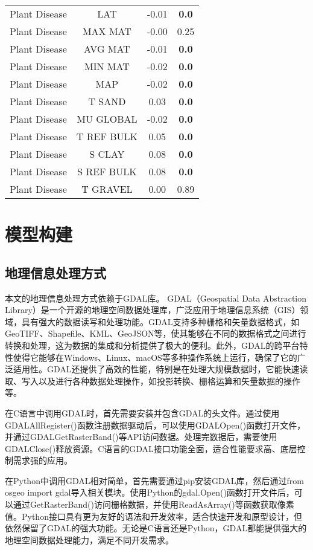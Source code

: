 \documentclass[AutoFakeBold]{LZUThesis-PgD&PhD}
\begin{document}
\begin{table}[H]
\begin{tabular}{cccc}
			Plant Disease & LAT & -0.01 & \textbf{0.0} \\
			Plant Disease & MAX MAT & -0.00 & 0.25 \\
			Plant Disease & AVG MAT & -0.01 & \textbf{0.0} \\
			Plant Disease & MIN MAT & -0.02 & \textbf{0.0} \\
			Plant Disease & MAP & -0.02 & \textbf{0.0} \\
			Plant Disease & T SAND & 0.03 & \textbf{0.0} \\
			Plant Disease & MU GLOBAL & -0.02 & \textbf{0.0} \\
			Plant Disease & T REF BULK & 0.05 & \textbf{0.0} \\
			Plant Disease & S CLAY & 0.08 & \textbf{0.0} \\
			Plant Disease & S REF BULK & 0.08 & \textbf{0.0} \\
			Plant Disease & T GRAVEL & 0.00 & 0.89 \\
			\bottomrule
		\end{tabular}
	\end{table}
	
	\chapter{模型构建}
	
	\section{地理信息处理方式}
	
	本文的地理信息处理方式依赖于GDAL库。
	GDAL（Geospatial Data Abstraction Library）是一个开源的地理空间数据处理库，广泛应用于地理信息系统（GIS）领域，具有强大的数据读写和处理功能。GDAL支持多种栅格和矢量数据格式，如GeoTIFF、Shapefile、KML、GeoJSON等，使其能够在不同的数据格式之间进行转换和处理，这为数据的集成和分析提供了极大的便利。此外，GDAL的跨平台特性使得它能够在Windows、Linux、macOS等多种操作系统上运行，确保了它的广泛适用性。GDAL还提供了高效的性能，特别是在处理大规模数据时，它能快速读取、写入以及进行各种数据处理操作，如投影转换、栅格运算和矢量数据的操作等。
	
	在C语言中调用GDAL时，首先需要安装并包含GDAL的头文件。通过使用GDALAllRegister()函数注册数据驱动后，可以使用GDALOpen()函数打开文件，并通过GDALGetRasterBand()等API访问数据。处理完数据后，需要使用GDALClose()释放资源。C语言的GDAL接口功能全面，适合性能要求高、底层控制需求强的应用。
	
	在Python中调用GDAL相对简单，首先需要通过pip安装GDAL库，然后通过from osgeo import gdal导入相关模块。使用Python的gdal.Open()函数打开文件后，可以通过GetRasterBand()访问栅格数据，并使用ReadAsArray()等函数获取像素值。Python接口具有更为友好的语法和开发效率，适合快速开发和原型设计，但依然保留了GDAL的强大功能。无论是C语言还是Python，GDAL都能提供强大的地理空间数据处理能力，满足不同开发需求。
\end{document}
